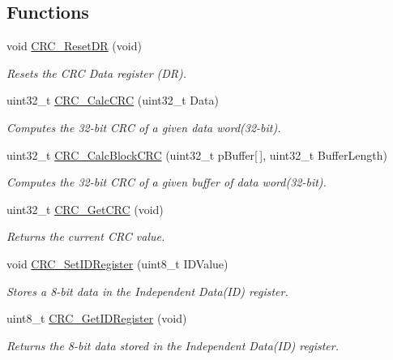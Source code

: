 \subsection*{Functions}
\begin{DoxyCompactItemize}
\item 
void \hyperlink{group___c_r_c___exported___functions_ga506467d5ef873a5a4ade4ae83cb110f6}{C\+R\+C\+\_\+\+Reset\+DR} (void)
\begin{DoxyCompactList}\small\item\em Resets the C\+RC Data register (DR). \end{DoxyCompactList}\item 
uint32\+\_\+t \hyperlink{group___c_r_c___exported___functions_ga5407fdbb8e8c9be6322cc8856ae5db3b}{C\+R\+C\+\_\+\+Calc\+C\+RC} (uint32\+\_\+t Data)
\begin{DoxyCompactList}\small\item\em Computes the 32-\/bit C\+RC of a given data word(32-\/bit). \end{DoxyCompactList}\item 
uint32\+\_\+t \hyperlink{group___c_r_c___exported___functions_gab15ebf620615c360048fb4f45b15fae6}{C\+R\+C\+\_\+\+Calc\+Block\+C\+RC} (uint32\+\_\+t p\+Buffer\mbox{[}$\,$\mbox{]}, uint32\+\_\+t Buffer\+Length)
\begin{DoxyCompactList}\small\item\em Computes the 32-\/bit C\+RC of a given buffer of data word(32-\/bit). \end{DoxyCompactList}\item 
uint32\+\_\+t \hyperlink{group___c_r_c___exported___functions_gab62db4561b0558f3c8ed53887fe7de8b}{C\+R\+C\+\_\+\+Get\+C\+RC} (void)
\begin{DoxyCompactList}\small\item\em Returns the current C\+RC value. \end{DoxyCompactList}\item 
void \hyperlink{group___c_r_c___exported___functions_ga769c9a42be57b972ae61bbada0f2e46a}{C\+R\+C\+\_\+\+Set\+I\+D\+Register} (uint8\+\_\+t I\+D\+Value)
\begin{DoxyCompactList}\small\item\em Stores a 8-\/bit data in the Independent Data(\+I\+D) register. \end{DoxyCompactList}\item 
uint8\+\_\+t \hyperlink{group___c_r_c___exported___functions_gaf869f6e9c3ca0ae0822cfad1abea7e5f}{C\+R\+C\+\_\+\+Get\+I\+D\+Register} (void)
\begin{DoxyCompactList}\small\item\em Returns the 8-\/bit data stored in the Independent Data(\+I\+D) register. \end{DoxyCompactList}\end{DoxyCompactItemize}


